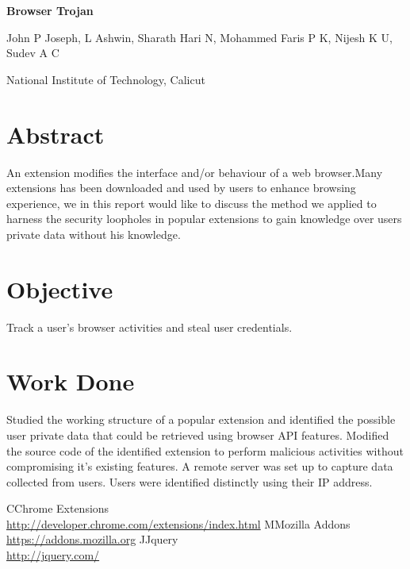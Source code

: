 \documentclass[12pt]{article}
\date{}
\begin{document}
\begin{center}
\begin{Huge}
\textbf{Browser Trojan} \linebreak
\end{Huge}

 John P Joseph, L Ashwin, Sharath Hari N,\linebreak
 Mohammed Faris P K, Nijesh K U, Sudev A C \linebreak
\begin{small}
 National Institute of Technology, Calicut 
\end{small}
\end{center}


\section*{Abstract}
An extension modifies the interface and/or behaviour of a web browser.Many extensions has been downloaded and used by users to enhance browsing experience, we in this report would like to discuss the method we applied to harness the security loopholes in popular extensions to gain knowledge over users private data  without his knowledge.

\section*{Objective}
Track a user's browser activities and steal user credentials.
\section*{Work Done}
Studied the working structure of a popular extension and identified the possible user private data that could be retrieved using browser API features. Modified the source code of the identified extension to perform malicious activities without compromising it's existing features. A remote server was set up to capture data collected from users. Users were identified distinctly using their IP address.


\begin{thebibliography}{99}

\bibitem CChrome Extensions\\ \url {http://developer.chrome.com/extensions/index.html}
\bibitem MMozilla Addons \\ \url {https://addons.mozilla.org}
\bibitem JJquery \\ \url {http://jquery.com/}
\end{thebibliography}
\end{document}
